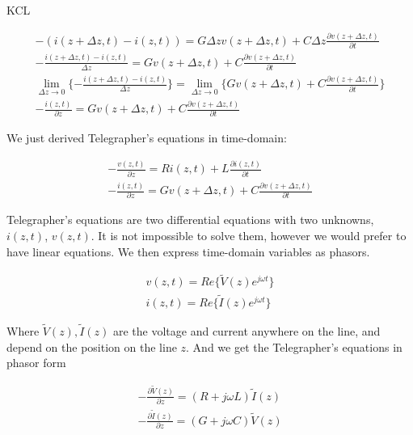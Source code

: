 \documentclass{ximera}
\begin{document}
KCL

\begin{eqnarray}
-( i(z+ \Delta z ,t)- i(z,t))= G \Delta z v(z+\Delta z,t)+C\Delta z
\frac{\partial v(z+\Delta z,t)}{\partial t} \label{te1kc11} \\
-\frac{ i(z+ \Delta z ,t)- i(z,t)}{\Delta z}= G v(z+\Delta z,t)+C
\frac{\partial v(z+\Delta z,t)}{\partial t} \label{te1kc21} \\
\lim_{\Delta z \to 0} \{-\frac{ i(z+ \Delta z ,t)- i(z,t)}{\Delta z} \}= \lim_{\Delta z \to 0} \{ G v(z+\Delta z,t)+C
\frac{\partial v(z+\Delta z,t)}{\partial t} \} \label{te1kc211} \\
-\frac{i(z,t) }{\partial z}= G v(z+\Delta z,t)+C
\frac{\partial v(z+\Delta z,t)}{\partial t} \label{te1kc31}
\end{eqnarray}



We just derived Telegrapher's equations in time-domain:



\begin{eqnarray}
-\frac{v(z,t) }{\partial z}=R i(z,t)+L 
 \frac{\partial i(z,t)}{\partial t} \nonumber  \\ \nonumber
-\frac{i(z,t) }{\partial z}= G v(z+\Delta z,t)+C
\frac{\partial v(z+\Delta z,t)}{\partial t} 
\end{eqnarray}


Telegrapher's equations are two differential equations with two unknowns, $i(z, t)$, $v(z, t)$. It is not
impossible to solve them, however we would prefer to have linear 
equations. We then express time-domain variables as phasors.

\begin{eqnarray}
v(z,t)=Re\{ \tilde{V}(z) e^{j \omega t} \} \nonumber \\
i(z,t)=Re\{ \tilde{I}(z) e^{j \omega t} \} \nonumber
\end{eqnarray}

Where $\tilde{V}(z),\tilde{I}(z) $ are the voltage and current anywhere on the line, and depend on the position on the line $z$. And we get the Telegrapher's equations in phasor form


\begin{eqnarray}
-\frac{\partial \tilde{V}(z)}{\partial z} = (R+j\omega L) \tilde{I}(z) \label{te11}\\
-\frac{\partial \tilde{I}(z)}{\partial z} = (G+j\omega C) \tilde{V}(z) \label{te121}
\end{eqnarray}
\end{document}
